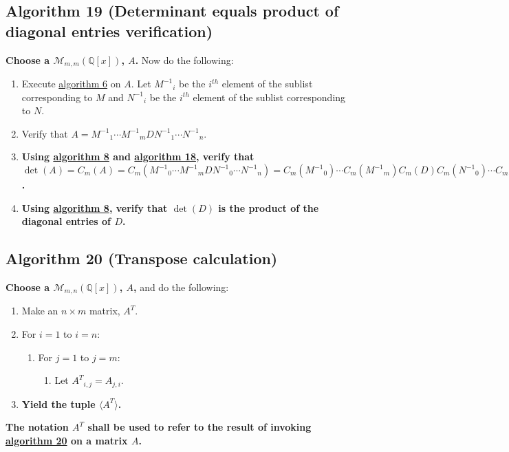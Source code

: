 \documentclass[twocolumn]{article}
\begin{document}
		\subsection{Algorithm 19 (Determinant equals product of diagonal entries verification)}\label{sec:algorithm 19}
			\textbf{Choose a $\mathcal{M}_{m,m}(\mathbb{Q}[x])$, $A$.} Now do the following:
			\begin{enumerate}
				\item Execute \hyperref[sec:algorithm 6]{algorithm 6} on $A$. Let ${M^{-1}}_i$ be the $i^{th}$ element of the sublist corresponding to $M$ and ${N^{-1}}_i$ be the $i^{th}$ element of the sublist corresponding to $N$.
				\item Verify that $A={M^{-1}}_1\cdots {M^{-1}}_mD{N^{-1}}_1\cdots {N^{-1}}_n$.
				\item \textbf{Using \hyperref[sec:algorithm 8]{algorithm 8} and \hyperref[sec:algorithm 18]{algorithm 18}, verify that $\det(A)=C_m(A)=C_m({M^{-1}}_0\cdots {M^{-1}}_mD{N^{-1}}_0\cdots {N^{-1}}_n)=C_m({M^{-1}}_0)\cdots C_m({M^{-1}}_m)C_m(D)C_m({N^{-1}}_0)\cdots C_m({N^{-1}}_n)=1\cdots 1C_m(D)1\cdots 1=C_m(D)=\det(D)$.}
				\item \textbf{Using \hyperref[sec:algorithm 8]{algorithm 8}, verify that $\det(D)$ is the product of the diagonal entries of $D$.}
			\end{enumerate}
		\subsection{Algorithm 20 (Transpose calculation)}\label{sec:algorithm 20}
			\textbf{Choose a $\mathcal{M}_{m,n}(\mathbb{Q}[x])$, $A$,} and do the following:
			\begin{enumerate}
				\item Make an $n\times m$ matrix, $A^T$.
				\item For $i=1$ to $i=n$:
				\begin{enumerate}
					\item For $j=1$ to $j=m$:
					\begin{enumerate}
						\item Let ${A^T}_{i,j}=A_{j,i}$.
					\end{enumerate}
				\end{enumerate}
				\item \textbf{Yield the tuple $\langle A^T\rangle$.}
			\end{enumerate}
			\textbf{The notation $A^T$ shall be used to refer to the result of invoking \hyperref[sec:algorithm 20]{algorithm 20} on a matrix $A$.}
\end{document}
